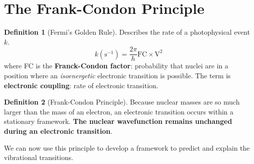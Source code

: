 \documentclass[a4paper]{tufte-handout}
\theoremstyle{definition}
\newtheorem{definition}{Definition}
\begin{document}
\section{The Frank-Condon Principle}

\begin{definition}[Fermi's Golden Rule] Describes the rate of a photophysical event $k$.
  \begin{equation}
    k(\mathrm{s}^{-1}) = \frac{2\pi}{h} \mathrm{FC} \times \mathrm{V}^2
  \end{equation}
  where FC is the \textbf{Franck-Condon factor}: probability that nuclei are in a position where an \textit{isoenergetic} electronic transition is possible.
  The  term is \textbf{electronic coupling}: rate of electronic transition.


\end{definition}

\begin{definition}[Frank-Condon Principle]
  Because nuclear masses are so much larger than the mass of an electron, an electronic transition occurs
  within a stationary framework. \textbf{The nuclear wavefunction remains unchanged during an electronic transition}.
\end{definition}

We can now use this principle to develop a framework to predict and explain the vibrational transitions.
\end{document}
